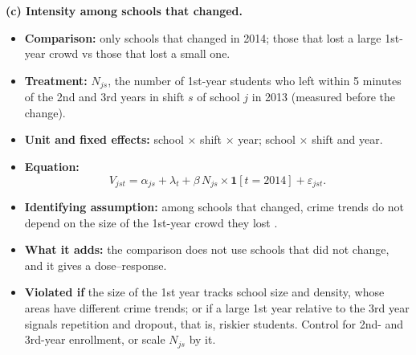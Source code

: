 \documentclass[11pt]{article}
\begin{document}
\medskip
\noindent\textbf{(c) Intensity among schools that changed.}
\begin{itemize}
  \item \textbf{Comparison:} only schools that changed in 2014; those that lost
        a large 1st-year crowd vs those that lost a small one.
  \item \textbf{Treatment:} $N_{js}$, the number of 1st-year students who left
        within 5 minutes of the 2nd and 3rd years in shift $s$ of school $j$ in
        2013 (measured before the change).
  \item \textbf{Unit and fixed effects:} school $\times$ shift $\times$ year;
        school $\times$ shift and year.
  \item \textbf{Equation:}
        \begin{equation}
          V_{jst} = \alpha_{js} + \lambda_t + \beta\, N_{js} \times
          \mathbf{1}[t=2014] + \varepsilon_{jst}.
        \end{equation}
  \item \textbf{Identifying assumption:} among schools that changed, crime
        trends do not depend on the size of the 1st-year crowd they lost
        \citep[strong parallel trends;][]{callaway2024}.
  \item \textbf{What it adds:} the comparison does not use schools that did not
        change, and it gives a dose--response.
  \item \textbf{Violated if} the size of the 1st year tracks school size and
        density, whose areas have different crime trends; or if a large 1st
        year relative to the 3rd year signals repetition and dropout, that is,
        riskier students. Control for 2nd- and 3rd-year enrollment, or scale
        $N_{js}$ by it.
\end{itemize}
\end{document}

